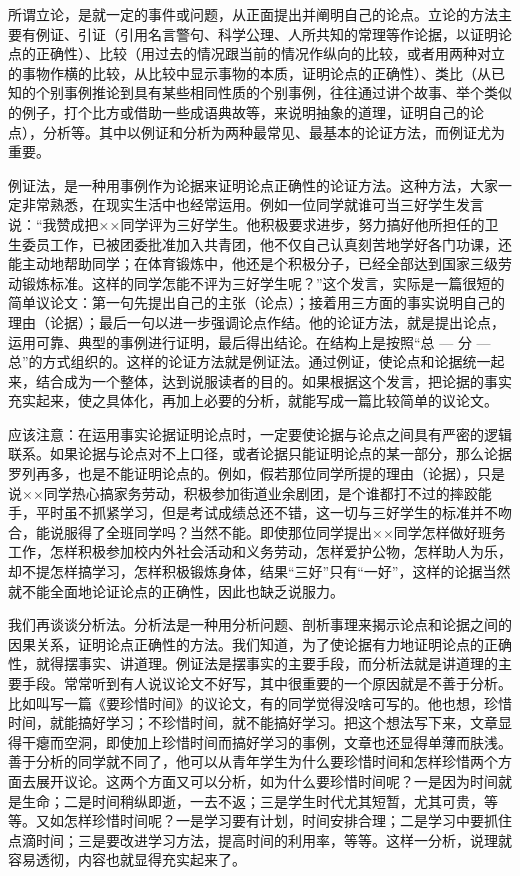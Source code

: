 所谓立论，是就一定的事件或问题，从正面提出并阐明自己的论点。立论的方法主要有例证、引证（引用名言警句、科学公理、人所共知的常理等作论据，以证明论点的正确性）、比较（用过去的情况跟当前的情况作纵向的比较，或者用两种对立的事物作横的比较，从比较中显示事物的本质，证明论点的正确性）、类比（从已知的个别事例推论到具有某些相同性质的个别事例，往往通过讲个故事、举个类似的例子，打个比方或借助一些成语典故等，来说明抽象的道理，证明自己的论点），分析等。其中以例证和分析为两种最常见、最基本的论证方法，而例证尤为重要。

例证法，是一种用事例作为论据来证明论点正确性的论证方法。这种方法，大家一定非常熟悉，在现实生活中也经常运用。例如一位同学就谁可当三好学生发言说：“我赞成把××同学评为三好学生。他积极要求进步，努力搞好他所担任的卫生委员工作，已被团委批准加入共青团，他不仅自己认真刻苦地学好各门功课，还能主动地帮助同学；在体育锻炼中，他还是个积极分子，已经全部达到国家三级劳动锻炼标准。这样的同学怎能不评为三好学生呢？”这个发言，实际是一篇很短的简单议论文：第一句先提出自己的主张（论点）；接着用三方面的事实说明自己的理由（论据）；最后一句以进一步强调论点作结。他的论证方法，就是提出论点，运用可靠、典型的事例进行证明，最后得出结论。在结构上是按照“总 --- 分 --- 总”的方式组织的。这样的论证方法就是例证法。通过例证，使论点和论据统一起来，结合成为一个整体，达到说服读者的目的。如果根据这个发言，把论据的事实充实起来，使之具体化，再加上必要的分析，就能写成一篇比较简单的议论文。

应该注意：在运用事实论据证明论点时，一定要使论据与论点之间具有严密的逻辑联系。如果论据与论点对不上口径，或者论据只能证明论点的某一部分，那么论据罗列再多，也是不能证明论点的。例如，假若那位同学所提的理由（论据），只是说××同学热心搞家务劳动，积极参加街道业余剧团，是个谁都打不过的摔跤能手，平时虽不抓紧学习，但是考试成绩总还不错，这一切与三好学生的标准并不吻合，能说服得了全班同学吗？当然不能。即使那位同学提出××同学怎样做好班务工作，怎样积极参加校内外社会活动和义务劳动，怎样爱护公物，怎样助人为乐，却不提怎样搞学习，怎样积极锻炼身体，结果“三好”只有“一好”，这样的论据当然就不能全面地论证论点的正确性，因此也缺乏说服力。

我们再谈谈分析法。分析法是一种用分析问题、剖析事理来揭示论点和论据之间的因果关系，证明论点正确性的方法。我们知道，为了使论据有力地证明论点的正确性，就得摆事实、讲道理。例证法是摆事实的主要手段，而分析法就是讲道理的主要手段。常常听到有人说议论文不好写，其中很重要的一个原因就是不善于分析。比如叫写一篇《要珍惜时间》的议论文，有的同学觉得没啥可写的。他也想，珍惜时间，就能搞好学习；不珍惜时间，就不能搞好学习。把这个想法写下来，文章显得干瘪而空洞，即使加上珍惜时间而搞好学习的事例，文章也还显得单薄而肤浅。善于分析的同学就不同了，他可以从青年学生为什么要珍惜时间和怎样珍惜两个方面去展开议论。这两个方面又可以分析，如为什么要珍惜时间呢？一是因为时间就是生命；二是时间稍纵即逝，一去不返；三是学生时代尤其短暂，尤其可贵，等等。又如怎样珍惜时间呢？一是学习要有计划，时间安排合理；二是学习中要抓住点滴时间；三是要改进学习方法，提高时间的利用率，等等。这样一分析，说理就容易透彻，内容也就显得充实起来了。

